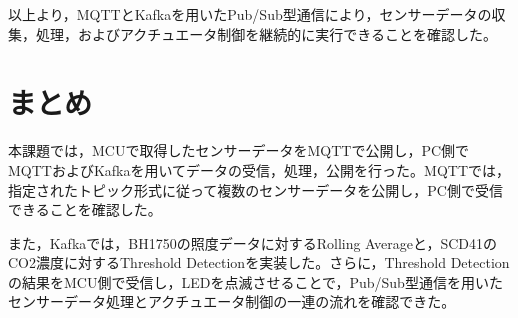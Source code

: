 \documentclass[a4paper,11pt,lualatex,ja=standard]{bxjsarticle}
\begin{document}
以上より，MQTTとKafkaを用いたPub/Sub型通信により，センサーデータの収集，処理，およびアクチュエータ制御を継続的に実行できることを確認した。

\section{まとめ}

本課題では，MCUで取得したセンサーデータをMQTTで公開し，PC側でMQTTおよびKafkaを用いてデータの受信，処理，公開を行った。MQTTでは，指定されたトピック形式に従って複数のセンサーデータを公開し，PC側で受信できることを確認した。

また，Kafkaでは，BH1750の照度データに対するRolling Averageと，SCD41のCO2濃度に対するThreshold Detectionを実装した。さらに，Threshold Detectionの結果をMCU側で受信し，LEDを点滅させることで，Pub/Sub型通信を用いたセンサーデータ処理とアクチュエータ制御の一連の流れを確認できた。
\end{document}
